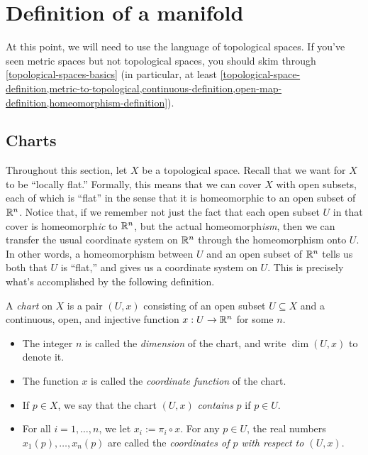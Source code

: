 \section{Definition of a manifold}

At this point, we will need to use the language of topological spaces. If you've seen metric spaces but not topological spaces, you should skim through \cref{topological-spaces-basics} (in particular, at least \cref{topological-space-definition,metric-to-topological,continuous-definition,open-map-definition,homeomorphism-definition}).

\subsection{Charts}

Throughout this section, let $X$ be a topological space. Recall that we want for $X$ to be ``locally flat.'' Formally, this means that we can cover $X$ with open subsets, each of which is ``flat'' in the sense that it is homeomorphic to an open subset of $\mathbb{R}^n$. Notice that, if we remember not just the fact that each open subset $U$ in that cover is homeomorph\emph{ic} to $\mathbb{R}^n$, but the actual homeomorph\emph{ism}, then we can transfer the usual coordinate system on $\mathbb{R}^n$ through the homeomorphism onto $U$. In other words, a homeomorphism between $U$ and an open subset of $\mathbb{R}^n$ tells us both that $U$ is ``flat,'' and gives us a coordinate system on $U$. This is precisely what's accomplished by the following definition. 

\begin{definition}[Chart] 
	A \emph{chart} on $X$ is a pair $(U, x)$ consisting of an open subset $U \subseteq X$ and a continuous, open, and injective function $x : U \to \mathbb{R}^n$ for some $n$. 
	\begin{itemize}
		\item The integer $n$ is called the \emph{dimension} of the chart, and write $\dim (U,x)$ to denote it. 
		\item The function $x$ is called the \emph{coordinate function} of the chart. 
		\item If $p \in X$, we say that the chart $(U,x)$ \emph{contains} $p$ if $p \in U$. 
		\item For all $i = 1, \dotsc, n$, we let $x_i := \pi_i \circ x$. For any $p \in U$, the real numbers $x_1(p), \dotsc, x_n(p)$ are called the \emph{coordinates of $p$ with respect to $(U,x)$}.
	\end{itemize} 
\end{definition}

